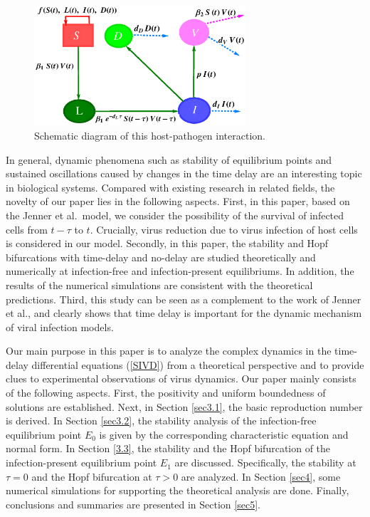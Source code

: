 \documentclass{CMHPhD-SIVD}
\begin{document}
\begin{figure}[h!]
\centering
\includegraphics[height=0.350\textheight,width=0.7\textwidth]{s.eps}
\vspace{3mm}
\caption{Schematic diagram of this host-pathogen interaction.}
\label{Fig.1}
\end{figure}

In general, dynamic phenomena such as stability of equilibrium points and sustained oscillations caused by changes in the time delay are an interesting topic in biological systems. Compared with existing research in related fields, the novelty of our paper lies in the following aspects. First, in this paper, based on the Jenner et al.\ model, we consider the possibility of the survival of infected cells from $t-\tau$ to $t$.  Crucially, virus reduction due to virus infection of host cells is considered in our model. Secondly, in this paper, the stability and Hopf bifurcations with time-delay and no-delay are studied theoretically and numerically at infection-free and infection-present equilibriums. In addition, the results of the numerical simulations are consistent with the theoretical predictions. Third, this study can be seen as a complement to the work of Jenner et al., and clearly shows that time delay is important for the dynamic mechanism of viral infection models.

Our main purpose in this paper is to analyze the complex dynamics in the time-delay differential equations (\ref{SIVD}) from a theoretical perspective and to provide clues to experimental observations of virus dynamics. Our paper mainly consists of the following aspects. First, the positivity and uniform boundedness of solutions are established. Next, in Section \ref{sec3.1}, the basic reproduction number is derived. In Section \ref{sec3.2}, the stability analysis of the infection-free equilibrium point $E_0$ is given by the corresponding characteristic equation and normal form. In Section \ref{3.3}, the stability and the Hopf bifurcation of the  infection-present equilibrium point $E_1$ are discussed. Specifically, the stability at $\tau=0$ and the Hopf bifurcation at $\tau>0$ are analyzed. In Section \ref{sec4}, some numerical simulations for supporting the theoretical analysis are done. Finally, conclusions and summaries are presented in Section \ref{sec5}.
\end{document}
